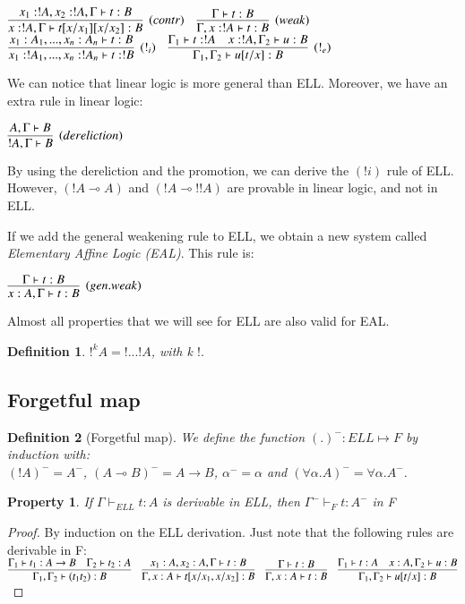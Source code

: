\documentclass[a4paper,10pt]{article}
\newcommand{\impl}{\rightarrow}	%
\newcommand{\limpl}{\multimap}  %
\newtheorem{definition}{Definition}
\newtheorem{prop}{Property}
\begin{document}
\begin{center}
$	\infer[(contr)]{x:!A, \Gamma \vdash t[x/x_1][x/x_2]:B}{x_1 : !A, x_2 : !A, \Gamma \vdash t : B } \quad
	\infer[(weak)]{\Gamma, x:!A \vdash t : B}{\Gamma \vdash t:B}$ \\
	\vspace{0.5cm}
$	\infer[(!_i)]{x_1 : !A_1, ..., x_n : !A_n \vdash t : !B}{x_1 : A_1, ..., x_n : A_n \vdash t : B} \quad
	\infer[(!_e)]{\Gamma_1, \Gamma_2 \vdash u[t/x] : B}{\Gamma_1 \vdash t:!A  &  x:!A,\Gamma_2 \vdash u:B}
$
\end{center}

 We can notice that linear logic is more general than ELL. Moreover, we have an extra rule in linear logic:
\begin{center}
$\infer[(dereliction)]{!A, \Gamma \vdash B}{A, \Gamma \vdash B }$
\end{center}

 By using the dereliction and the promotion, we can derive the $(!i)$ rule of ELL. However, $(!A \limpl A)$ and $(!A \limpl !!A)$ are provable in linear logic, and not in ELL.

 If we add the general weakening rule to ELL, we obtain a new system called \emph{Elementary Affine Logic (EAL)}. This rule is:
\begin{center}
$\infer[(gen.weak)]{x:A, \Gamma \vdash t:B}{\Gamma \vdash t:B }$
\end{center}

Almost all properties that we will see for ELL are also valid for EAL.

\begin{definition}
$!^k A = !...! A$, with k $!$.
\end{definition}



\subsection{Forgetful map}

\begin{definition}[Forgetful map]
 We define the function $(.)^{-} : ELL \mapsto F$ by induction with:\\
$(!A)^{-} = A^{-}$, $(A \limpl B)^{-} = A \impl B$, $\alpha^{-} = \alpha$ and $(\forall \alpha.A)^{-} = \forall \alpha.A^{-}$.
\end{definition}

\begin{prop}
 If $\Gamma \vdash_{ELL} t:A$ is derivable in ELL, then $\Gamma^{-} \vdash_{F} t:A^{-}$ in F
\end{prop}
\begin{proof}
By induction on the ELL derivation. Just note that the following rules are derivable in F:\\
$	\infer{\Gamma_1 , \Gamma_2 \vdash (t_1 t_2):B}{\Gamma_1 \vdash t_1 :A \impl B & \Gamma_2 \vdash t_2 : A } \quad
	\infer{\Gamma, x:A \vdash t[x/x_1 , x/x_2] : B}{x_1 :A, x_2 :A, \Gamma \vdash t:B} \quad
	\infer{\Gamma , x:A \vdash t : B}{\Gamma \vdash t : B} \quad
	\infer{\Gamma_1, \Gamma_2 \vdash u[t/x] : B}{\Gamma_1 \vdash t:A  &  x:A,\Gamma_2 \vdash u:B} $
\end{proof}
\end{document}

